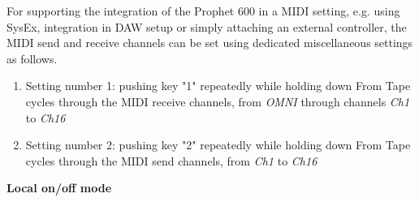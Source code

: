 For supporting the integration of the Prophet 600 in a MIDI setting, e.g. using SysEx, integration in DAW setup or simply attaching an external controller, the MIDI send and receive channels can be set using dedicated miscellaneous settings as follows.

\begin{enumerate}
  \setlength\itemsep{0cm}
  \item Setting number 1: pushing key "1" repeatedly while holding down From Tape cycles through the MIDI receive channels, from \textit{OMNI} through channels \textit{Ch1} to \textit{Ch16}
  \item Setting number 2: pushing key "2" repeatedly while holding down From Tape cycles through the MIDI send channels, from \textit{Ch1} to \textit{Ch16}
\end{enumerate}

\textbf{Local on/off mode}
